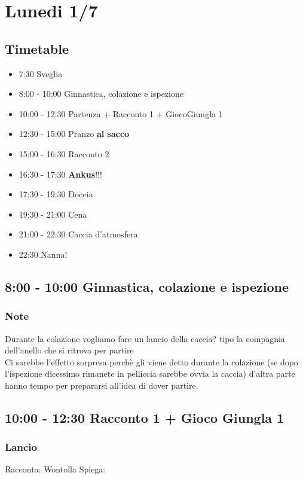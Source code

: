 \documentclass[../main.tex]{subfiles}
\begin{document}
   \section{Lunedi 1/7}
   \subsection{Timetable}
   \begin{itemize}
        \item 7:30 Sveglia
        \item 8:00 - 10:00 Ginnastica, colazione e ispezione
        \item 10:00 - 12:30 Partenza + Racconto 1 + GiocoGiungla 1
        \item 12:30 - 15:00 Pranzo \textbf{al sacco}
        \item 15:00 - 16:30 Racconto 2
        \item 16:30 - 17:30 \textbf{Ankus}!!!
        \item 17:30 - 19:30 Doccia
        \item 19:30 - 21:00 Cena
        \item 21:00 - 22:30 Caccia d'atmosfera
        \item 22:30 Nanna!
    \end{itemize}

    \subsection{8:00 - 10:00 Ginnastica, colazione e ispezione}
        \subsubsection{Note}
        Durante la colazione vogliamo fare un lancio della caccia? tipo la compagnia dell'anello che si ritrova per partire \\ 
        Ci sarebbe l'effetto sorpresa perchè gli viene detto durante la colazione (se dopo l'ispezione dicessimo rimanete in pelliccia sarebbe ovvia la caccia) d'altra parte hanno tempo per prepararsi all'idea di dover partire.
    \subsection{10:00 - 12:30 Racconto 1 + Gioco Giungla 1}
       \subsubsection{Lancio}
        Racconta: Wontolla
        Spiega:
\end{document}
